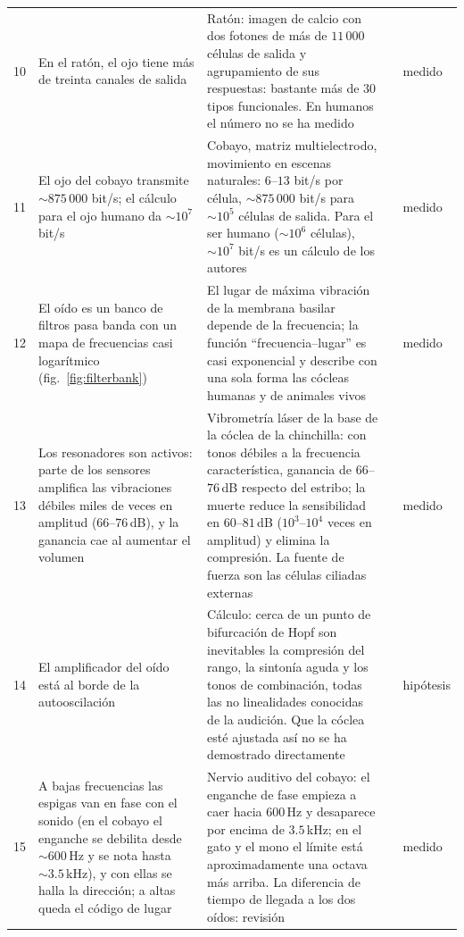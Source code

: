 {\begin{longtable}{>{\raggedright}p{0.5cm}>{\raggedright}p{4.0cm}>{\raggedright}p{5.6cm}>{\raggedright}p{2.3cm}>{\raggedright\arraybackslash}p{1.7cm}}
10 & En el ratón, el ojo tiene más de treinta canales de salida & Ratón: imagen de calcio con dos fotones de más de $11\,000$ células de salida y agrupamiento de sus respuestas: bastante más de $30$ tipos funcionales. En humanos el número no se ha medido & \cite{Baden2016} & medido \\
11 & El ojo del cobayo transmite $\sim875\,000$ bit/s; el cálculo para el ojo humano da $\sim10^7$ bit/s & Cobayo, matriz multielectrodo, movimiento en escenas naturales: $6$--$13$ bit/s por célula, $\sim875\,000$ bit/s para $\sim10^5$ células de salida. Para el ser humano ($\sim10^6$ células), $\sim10^7$ bit/s es un cálculo de los autores & \cite{Koch2006} & medido \\
12 & El oído es un banco de filtros pasa banda con un mapa de frecuencias casi logarítmico (fig.~\ref{fig:filterbank}) & El lugar de máxima vibración de la membrana basilar depende de la frecuencia; la función “frecuencia--lugar” es casi exponencial y describe con una sola forma las cócleas humanas y de animales vivos & \cite{Greenwood1990,Robles2001} & medido \\
13 & Los resonadores son activos: parte de los sensores amplifica las vibraciones débiles miles de veces en amplitud ($66$--$76$\,dB), y la ganancia cae al aumentar el volumen & Vibrometría láser de la base de la cóclea de la chinchilla: con tonos débiles a la frecuencia característica, ganancia de $66$--$76$\,dB respecto del estribo; la muerte reduce la sensibilidad en $60$--$81$\,dB ($10^3$--$10^4$ veces en amplitud) y elimina la compresión. La fuente de fuerza son las células ciliadas externas & \cite{Ruggero1997,Robles2001} & medido \\
14 & El amplificador del oído está al borde de la autooscilación & Cálculo: cerca de un punto de bifurcación de Hopf son inevitables la compresión del rango, la sintonía aguda y los tonos de combinación, todas las no linealidades conocidas de la audición. Que la cóclea esté ajustada así no se ha demostrado directamente & \cite{Eguiluz2000} & hipótesis \\
15 & A bajas frecuencias las espigas van en fase con el sonido (en el cobayo el enganche se debilita desde $\sim600$\,Hz y se nota hasta $\sim3.5$\,kHz), y con ellas se halla la dirección; a altas queda el código de lugar & Nervio auditivo del cobayo: el enganche de fase empieza a caer hacia $600$\,Hz y desaparece por encima de $3.5$\,kHz; en el gato y el mono el límite está aproximadamente una octava más arriba. La diferencia de tiempo de llegada a los dos oídos: revisión & \cite{PalmerRussell1986,Grothe2010} & medido \\

\end{longtable}}
